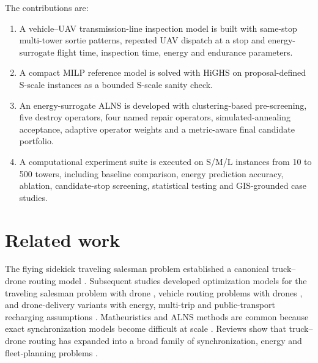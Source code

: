 \documentclass[final,5p,twocolumn,number,nopreprintline]{elsarticle}
\newcommand{\rev}[1]{{\color{blue}#1}}
\begin{document}
The contributions are:
\begin{enumerate}
    \item \rev{A vehicle--UAV transmission-line inspection model is built with same-stop multi-tower sortie patterns, repeated UAV dispatch at a stop and energy-surrogate flight time, inspection time, energy and endurance parameters.}
    \item A compact MILP reference model is solved with HiGHS on proposal-defined S-scale instances as a bounded S-scale sanity check.
    \item \rev{An energy-surrogate ALNS is developed with clustering-based pre-screening, five destroy operators, four named repair operators, simulated-annealing acceptance, adaptive operator weights and a metric-aware final candidate portfolio.}
    \item \rev{A computational experiment suite is executed on S/M/L instances from 10 to 500 towers, including baseline comparison, energy prediction accuracy, ablation, candidate-stop screening, statistical testing and GIS-grounded case studies.}
\end{enumerate}

\section{Related work}
\label{sec:related}

The flying sidekick traveling salesman problem established a canonical truck--drone routing model \cite{murray2015flying}. Subsequent studies developed optimization models for the traveling salesman problem with drone \cite{agatz2018tspdrone,poikonen2019branch,roberti2021exact}, vehicle routing problems with drones \cite{poikonen2017extended,wang2017worstcase,wang2019vrpd}, and drone-delivery variants with energy, multi-trip and public-transport recharging assumptions \cite{dorling2017vehicle,moadab2022drone,asoc2023recharging}. Matheuristics and ALNS methods are common because exact synchronization models become difficult at scale \cite{schermer2019matheuristic,sacramento2019alns}. Reviews show that truck--drone routing has expanded into a broad family of synchronization, energy and fleet-planning problems \cite{otto2018survey,macrina2020review,liang2022survey}.
\end{document}
